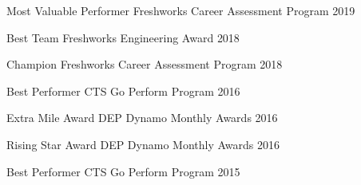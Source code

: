 
\begin{cvhonors}

  \cvhonor
    {Most Valuable Performer} %
    {Freshworks Career Assessment Program} %
    {} %
    {2019} %

  \cvhonor
    {Best Team} %
    {Freshworks Engineering Award} %
    {} %
    {2018} %
    
  \cvhonor
    {Champion} %
    {Freshworks Career Assessment Program} %
    {} %
    {2018} %

  \cvhonor
    {Best Performer} %
    {CTS Go Perform Program} %
    {} %
    {2016} %
    
  \cvhonor
    {Extra Mile Award} %
    {DEP Dynamo Monthly Awards} %
    {} %
    {2016} %

  \cvhonor
    {Rising Star Award} %
    {DEP Dynamo Monthly Awards} %
    {} %
    {2016} %

  \cvhonor
    {Best Performer} %
    {CTS Go Perform Program} %
    {} %
    {2015} %

\end{cvhonors}

